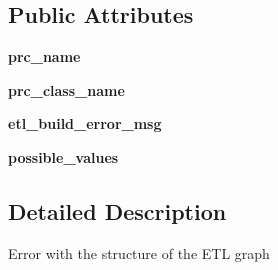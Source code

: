 \subsection*{Public Attributes}
\begin{DoxyCompactItemize}
\item 
\hypertarget{classetl_1_1exceptions_1_1EtlBuildError_a95176d74ba9649f6f5736c3a4cf5ec2d}{{\bfseries prc\-\_\-name}}\label{classetl_1_1exceptions_1_1EtlBuildError_a95176d74ba9649f6f5736c3a4cf5ec2d}

\item 
\hypertarget{classetl_1_1exceptions_1_1EtlBuildError_a1ed55d1a80852a9b934e82bfa93eb84d}{{\bfseries prc\-\_\-class\-\_\-name}}\label{classetl_1_1exceptions_1_1EtlBuildError_a1ed55d1a80852a9b934e82bfa93eb84d}

\item 
\hypertarget{classetl_1_1exceptions_1_1EtlBuildError_a67a70799f2f796627d37e3f9dd1cb630}{{\bfseries etl\-\_\-build\-\_\-error\-\_\-msg}}\label{classetl_1_1exceptions_1_1EtlBuildError_a67a70799f2f796627d37e3f9dd1cb630}

\item 
\hypertarget{classetl_1_1exceptions_1_1EtlBuildError_ab5977adc46b62cd167e3ad4d74752f76}{{\bfseries possible\-\_\-values}}\label{classetl_1_1exceptions_1_1EtlBuildError_ab5977adc46b62cd167e3ad4d74752f76}

\end{DoxyCompactItemize}


\subsection{Detailed Description}
\begin{DoxyVerb}Error with the structure of the ETL graph\end{DoxyVerb}
 

